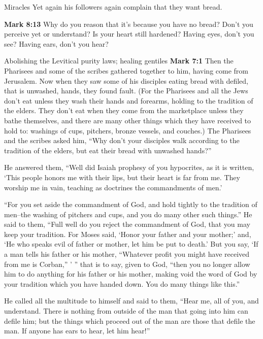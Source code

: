 \documentclass[10pt,twoside]{book}
\newcommand{\quotesize}{\normalsize{}}
\newcommand{\comm}[1]{\begingroup \color{black!50} #1\endgroup}
\newenvironment{quotetext}{\begingroup\quotesize}{\endgroup}
\newcommand{\bible}[2]{\begin{quotetext}\textbf{#1} #2\end{quotetext}}
\newcommand{\gospelmark}[2]{\bible{Mark #1}{#2}}
\begin{document}
\begin{section}{Miracles}
\comm{Yet again his followers again complain that they want bread.}

\gospelmark{8:13}{
Why do you reason that it's because you have no bread? Don't you perceive yet or understand? Is your heart still hardened?    Having eyes, don't you see? Having ears, don't you hear?
}

\end{section}

\begin{section}{Abolishing the Levitical purity laws; healing gentiles}
\gospelmark{7:1}{
 Then the Pharisees and some of the scribes gathered together to him, having come from Jerusalem.   Now when they saw some of his disciples eating bread with defiled, that is unwashed, hands, they found fault.   (For the Pharisees and all the Jews don't eat unless they wash their hands and forearms, holding to the tradition of the elders.   They don't eat when they come from the marketplace unless they bathe themselves, and there are many other things which they have received to hold to: washings of cups, pitchers, bronze vessels, and couches.)   The Pharisees and the scribes asked him, ``Why don't your disciples walk according to the tradition of the elders, but eat their bread with unwashed hands?''

  He answered them, ``Well did Isaiah prophesy of you hypocrites, as it is written,
`This people honors me with their lips,
but their heart is far from me.
   They worship me in vain,
teaching as doctrines the commandments of men.'

   ``For you set aside the commandment of God, and hold tightly to the tradition of men--the washing of pitchers and cups, and you do many other such things.''   He said to them, ``Full well do you reject the commandment of God, that you may keep your tradition.    For Moses said, `Honor your father and your mother;' and, `He who speaks evil of father or mother, let him be put to death.'    But you say, `If a man tells his father or his mother, ``Whatever profit you might have received from me is Corban,'' ' '' that is to say, given to God,    ``then you no longer allow him to do anything for his father or his mother,    making void the word of God by your tradition which you have handed down. You do many things like this.''

  He called all the multitude to himself and said to them, ``Hear me, all of you, and understand.    There is nothing from outside of the man that going into him can defile him; but the things which proceed out of the man are those that defile the man.    If anyone has ears to hear, let him hear!''

}
\end{section}
\end{document}
